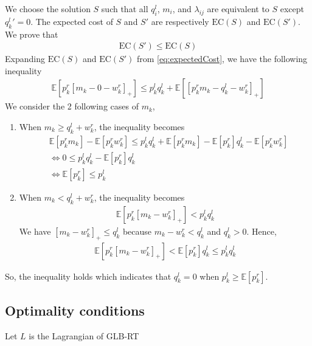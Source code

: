 We choose the solution $S$ such that all $q^l_i$, $m_i$, and $\lambda_{ij}$ are equivalent to $S$ except $q^{l}_k{'} = 0$. 
The expected cost of $S$ and $S'$ are respectively $\text{EC}(S)$ and $\text{EC}(S')$. We prove that 
\begin{eqnarray}
\text{EC}(S') \leq \text{EC}(S)
\end{eqnarray}
Expanding $\text{EC}(S)$ and $\text{EC}(S')$ from \eqref{eq:expectedCost}, we have the following inequality
\begin{align}
	\mathbb{E}[p^r_k [m_k - 0 - w^r_k]_+] \leq p^l_k q^l_k + \mathbb{E}[[p^r_k m_k - q^l_k - w^r_k]_+]
\end{align}
We consider the 2 following cases of $m_k$,
\begin{enumerate}
	\item When $m_k \geq q^l_k+w^r_k$, the inequality becomes
	\begin{align}
		&	\mathbb{E}[p^r_k m_k] - \mathbb{E}[p^r_k w^r_k] \leq p^l_k q^l_k + \mathbb{E}[p^r_k m_k] -\mathbb{E}[p^r_k]q^l_k - \mathbb{E}[p^r_k w^r_k] \\
		&\Leftrightarrow	0 \leq p^l_k q^l_k  -\mathbb{E}[p^r_k]q^l_k \\
		&\Leftrightarrow	\mathbb{E}[p^r_k]  \leq p^l_k 
	\end{align}	
	\item 	When $m_k < q^l_k+w^r_k$, the inequality becomes
	\begin{align}
		\mathbb{E}[p^r_k [m_k - w^r_k]_+] < p^l_k q^l_k
	\end{align}
	We have $[m_k- w^r_k]_+ \leq q^l_k$ because $m_k- w^r_k<q^l_k$ and $q^l_k > 0$. Hence,
	\begin{align}
		\mathbb{E}[p^r_k [m_k - w^r_k]_+] < \mathbb{E}[p^r_k] q^l_k \leq p^l_k q^l_k
	\end{align}		
\end{enumerate}
So, the inequality holds which indicates that $q^l_k=0$ when $p^l_k \geq \mathbb{E}[p^r_k]$.

\subsection{Optimality conditions} Let $L$ is the Lagrangian of GLB-RT


